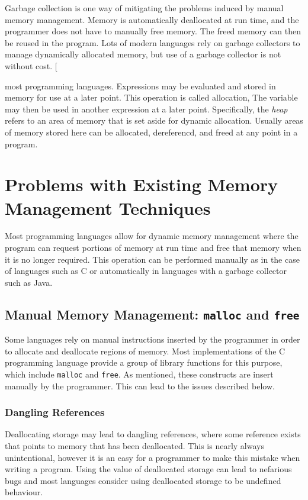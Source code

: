 Garbage collection is one way  of mitigating the problems induced by manual
memory management. Memory is automatically deallocated at run time, and the
programmer does not have to manually free memory. The freed memory can then be
reused in the program. Lots of modern languages rely on garbage collectors to 
manage dynamically allocated memory, but use of a garbage collector is not
without cost. 
[

most programming languages.  Expressions may be evaluated and stored in memory
for use at a later point. This operation is called allocation,  The variable may then be used in another expression
at a later point. Specifically, the \textit{heap} refers to an area
of memory that is set aside for dynamic allocation. Usually areas of memory
stored here can be allocated, dereferencd, and freed at any point in a program.


\section{Problems with Existing Memory Management Techniques}
Most programming languages allow for dynamic memory management where the
program can request portions of memory at run time and free that memory when it
is no longer required. This operation can be performed manually as in the case
of languages such as C or automatically in languages with a garbage collector
such as Java.

\subsection{Manual Memory Management: \lstinline{malloc} and \lstinline{free}}
Some languages rely on manual instructions inserted by the programmer in order
to allocate and deallocate regions of memory. Most implementations of the C
programming language provide a group of library functions for this purpose,
which include \lstinline{malloc} and \lstinline{free}. As mentioned, these
constructs are insert manually by the programmer. This can lead to the issues
described below.

\subsubsection{Dangling References}\label{sec:dangle}
Deallocating storage may lead to dangling references, where some reference 
exists that points to memory that has been deallocated. This is nearly always
unintentional, however it is an easy for a programmer to make this mistake when
writing a program. Using the value of deallocated storage can lead to nefarious
bugs and most languages consider using deallocated storage to
be undefined behaviour.

